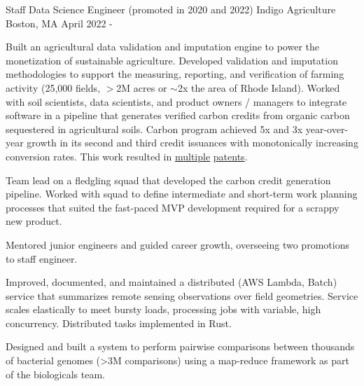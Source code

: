 

\begin{cventries}

  \cventry
    {Staff Data Science Engineer (promoted in 2020 and 2022)} %
    {Indigo Agriculture} %
    {Boston, MA} %
    {April 2022 -} %
    {
      \begin{cvitems} %
        \item {
            Built an agricultural data validation and imputation engine 
            to power the monetization of sustainable agriculture. 
            Developed validation and imputation methodologies to 
            support the measuring, reporting, and verification of 
            farming activity (25,000 fields, $>$2M acres or $\sim$2x the 
            area of Rhode Island). Worked with soil 
            scientists, data scientists, and product owners / managers 
            to integrate software in a pipeline that generates 
            verified carbon credits from organic carbon sequestered in 
            agricultural soils. Carbon program achieved 
            5x and 3x year-over-year growth in its second 
            and third credit issuances with monotonically increasing conversion 
            rates. This work resulted in 
            \href{https://patents.google.com/patent/US20230186408A1}{multiple} 
            \href{https://patents.google.com/patent/US20230078852A1}{patents}.
        }
        \item {
            Team lead on a fledgling squad that developed the carbon credit
            generation pipeline. Worked with squad to define intermediate and short-term
            work planning processes that suited the fast-paced MVP
            development required for a scrappy new product.
        }
        \item {
            Mentored junior engineers and guided career growth, overseeing two promotions to staff engineer.
        }
        \item {
            Improved, documented, and maintained a distributed (AWS Lambda, Batch) service 
            that summarizes remote sensing observations over field geometries. Service scales elastically to meet bursty loads, processing jobs with variable, high concurrency.
            Distributed tasks implemented in Rust.
        }
        \item {
            Designed and built a system to perform pairwise comparisons between thousands of 
            bacterial genomes (>3M comparisons) using a map-reduce framework as part of the
            biologicals team.
        }
      \end{cvitems}
    }


\end{cventries}
